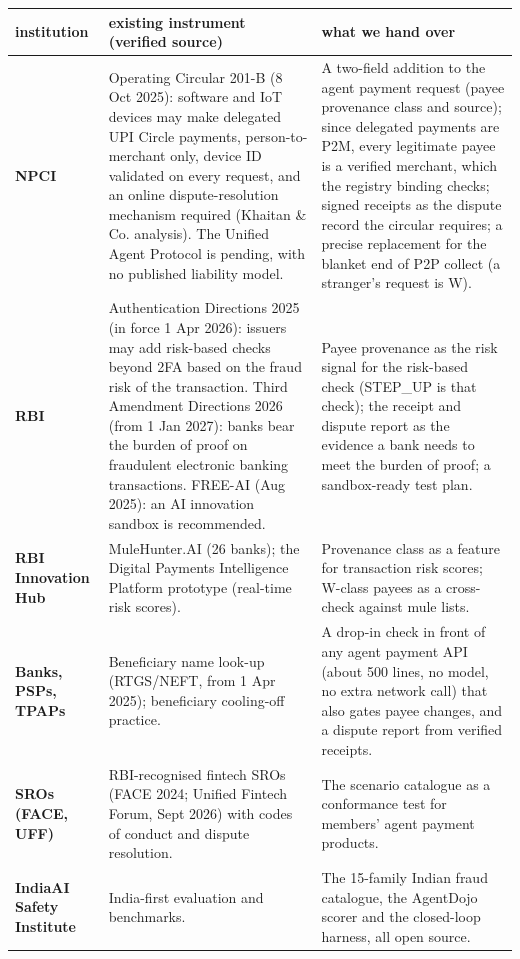 \documentclass[10pt,a4paper]{article}
\begin{document}
{\small
\begin{longtable}{p{2.4cm}p{\dimexpr\linewidth-7cm-6\tabcolsep\relax}p{4.6cm}}
\toprule
institution & existing instrument (verified source) & what we hand over\\
\midrule
\textbf{NPCI} & Operating Circular 201-B (8 Oct 2025): software and IoT devices may make delegated UPI Circle payments,
person-to-merchant only, device ID validated on every request, and an online dispute-resolution mechanism required
(Khaitan \& Co. analysis). The Unified Agent Protocol is pending, with no published liability model. &
A two-field addition to the agent payment request (payee provenance class and source); since delegated payments are P2M,
every legitimate payee is a verified merchant, which the registry binding checks; signed receipts as the dispute record
the circular requires; a precise replacement for the blanket end of P2P collect (a stranger's request is W).\\
\textbf{RBI} & Authentication Directions 2025 (in force 1 Apr 2026): issuers may add risk-based checks beyond 2FA based on
the fraud risk of the transaction. Third Amendment Directions 2026 (from 1 Jan 2027): banks bear the burden of proof on
fraudulent electronic banking transactions. FREE-AI (Aug 2025): an AI innovation sandbox is recommended. &
Payee provenance as the risk signal for the risk-based check (STEP\_UP is that check); the receipt and dispute report as
the evidence a bank needs to meet the burden of proof; a sandbox-ready test plan.\\
\textbf{RBI Innovation Hub} & MuleHunter.AI (26 banks); the Digital Payments Intelligence Platform prototype (real-time
risk scores). & Provenance class as a feature for transaction risk scores; W-class payees as a cross-check against mule
lists.\\
\textbf{Banks, PSPs, TPAPs} & Beneficiary name look-up (RTGS/NEFT, from 1 Apr 2025); beneficiary cooling-off practice. &
A drop-in check in front of any agent payment API (about 500 lines, no model, no extra network call) that also gates payee
changes, and a dispute report from verified receipts.\\
\textbf{SROs (FACE, UFF)} & RBI-recognised fintech SROs (FACE 2024; Unified Fintech Forum, Sept 2026) with codes of conduct
and dispute resolution. & The scenario catalogue as a conformance test for members' agent payment products.\\
\textbf{IndiaAI Safety Institute} & India-first evaluation and benchmarks. & The 15-family Indian fraud catalogue, the
AgentDojo scorer and the closed-loop harness, all open source.\\
\bottomrule
\end{longtable}}
\end{document}
